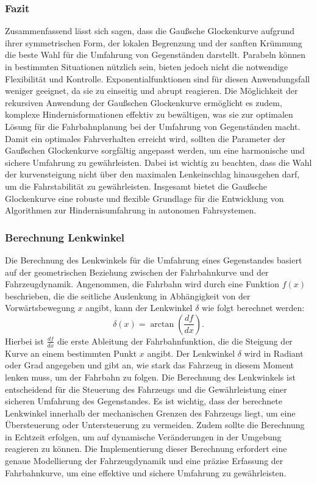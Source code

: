 \subsubsection*{Fazit}
Zusammenfassend lässt sich sagen, dass die Gaußsche Glockenkurve aufgrund ihrer symmetrischen Form, der lokalen Begrenzung und der sanften Krümmung die beste Wahl für die Umfahrung von Gegenständen darstellt. Parabeln können in bestimmten Situationen nützlich sein, bieten jedoch nicht die notwendige Flexibilität und Kontrolle. Exponentialfunktionen sind für diesen Anwendungsfall weniger geeignet, da sie zu einseitig und abrupt reagieren. Die Möglichkeit der rekursiven Anwendung der Gaußschen Glockenkurve ermöglicht es zudem, komplexe Hindernisformationen effektiv zu bewältigen, was sie zur optimalen Lösung für die Fahrbahnplanung bei der Umfahrung von Gegenständen macht.
Damit ein optimales Fahrverhalten erreicht wird, sollten die Parameter der Gaußschen Glockenkurve sorgfältig angepasst werden, um eine harmonische und sichere Umfahrung zu gewährleisten. Dabei ist wichtig zu beachten, dass die  Wahl der kurvensteigung nicht über den maximalen Lenkeinschlag hinausgehen darf, um die Fahrstabilität zu gewährleisten. Insgesamt bietet die Gaußsche Glockenkurve eine robuste und flexible Grundlage für die Entwicklung von Algorithmen zur Hindernisumfahrung in autonomen Fahrsystemen.

\subsubsection{Berechnung Lenkwinkel}
Die Berechnung des Lenkwinkels für die Umfahrung eines Gegenstandes basiert auf der geometrischen Beziehung zwischen der Fahrbahnkurve und der Fahrzeugdynamik. Angenommen, die Fahrbahn wird durch eine Funktion \(f(x)\) beschrieben, die die seitliche Auslenkung in Abhängigkeit von der Vorwärtsbewegung \(x\) angibt, kann der Lenkwinkel \(\delta\) wie folgt berechnet werden:
\[\delta(x) = \arctan\left(\frac{df}{dx}\right).\]
Hierbei ist \(\frac{df}{dx}\) die erste Ableitung der Fahrbahnfunktion, die die Steigung der Kurve an einem bestimmten Punkt \(x\) angibt. Der Lenkwinkel \(\delta\) wird in Radiant oder Grad angegeben und gibt an, wie stark das Fahrzeug in diesem Moment lenken muss, um der Fahrbahn zu folgen.
Die Berechnung des Lenkwinkels ist entscheidend für die Steuerung des Fahrzeugs und die Gewährleistung einer sicheren Umfahrung des Gegenstandes. Es ist wichtig, dass der berechnete Lenkwinkel innerhalb der mechanischen Grenzen des Fahrzeugs liegt, um eine Übersteuerung oder Untersteuerung zu vermeiden. Zudem sollte die Berechnung in Echtzeit erfolgen, um auf dynamische Veränderungen in der Umgebung reagieren zu können. Die Implementierung dieser Berechnung erfordert eine genaue Modellierung der Fahrzeugdynamik und eine präzise Erfassung der Fahrbahnkurve, um eine effektive und sichere Umfahrung zu gewährleisten.

